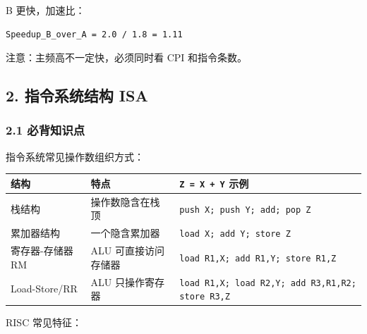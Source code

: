 \documentclass[
]{ctexart}
\newcommand{\passthrough}[1]{#1}
\newcounter{none} %
\begin{document}
B 更快，加速比：

\begin{lstlisting}
Speedup_B_over_A = 2.0 / 1.8 = 1.11
\end{lstlisting}

注意：主频高不一定快，必须同时看 CPI 和指令条数。

\subsection{2. 指令系统结构
ISA}\label{ux6307ux4ee4ux7cfbux7edfux7ed3ux6784-isa}

\subsubsection{2.1 必背知识点}\label{ux5fc5ux80ccux77e5ux8bc6ux70b9-1}

指令系统常见操作数组织方式：

{\def\LTcaptype{none} %
\begin{longtable}[]{@{}
  >{\raggedright\arraybackslash}p{}
  >{\raggedright\arraybackslash}p{}
  >{\raggedright\arraybackslash}p{}@{}}
\toprule\noalign{}
\begin{minipage}[b]{\linewidth}\raggedright
结构
\end{minipage} & \begin{minipage}[b]{\linewidth}\raggedright
特点
\end{minipage} & \begin{minipage}[b]{\linewidth}\raggedright
\passthrough{\lstinline!Z = X + Y!} 示例
\end{minipage} \\
\midrule\noalign{}
\endhead
\bottomrule\noalign{}
\endlastfoot
栈结构 & 操作数隐含在栈顶 &
\passthrough{\lstinline!push X; push Y; add; pop Z!} \\
累加器结构 & 一个隐含累加器 &
\passthrough{\lstinline!load X; add Y; store Z!} \\
寄存器-存储器 RM & ALU 可直接访问存储器 &
\passthrough{\lstinline!load R1,X; add R1,Y; store R1,Z!} \\
Load-Store/RR & ALU 只操作寄存器 &
\passthrough{\lstinline!load R1,X; load R2,Y; add R3,R1,R2; store R3,Z!} \\
\end{longtable}
}

RISC 常见特征：
\end{document}
